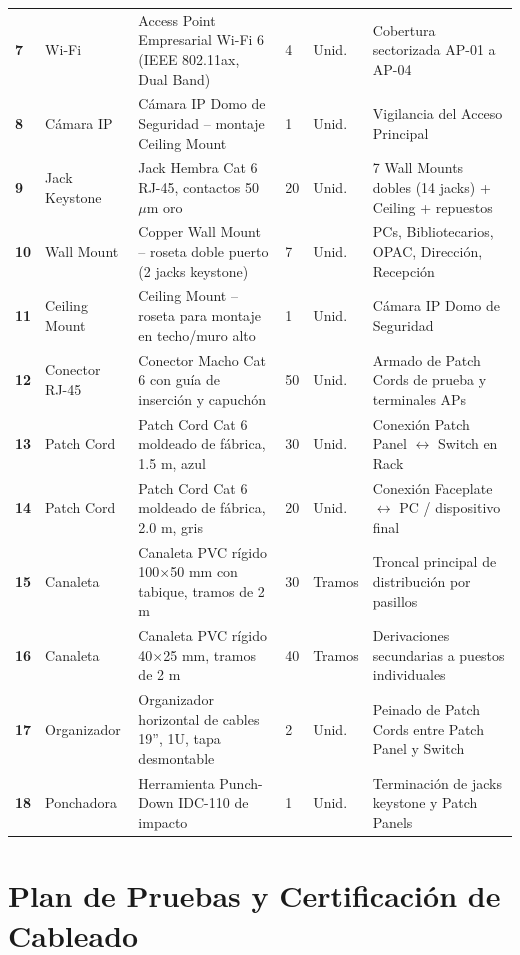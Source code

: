\documentclass[12pt,a4paper]{article}
\begin{document}
\begin{longtable}{>{\centering\bfseries\small}p{0.5cm}>{\small}p{1.9cm}>{\small}p{4.8cm}>{\centering\small}p{1.1cm}>{\centering\small}p{1cm}>{\small}p{3.6cm}}
  7  & Wi-Fi          & Access Point Empresarial Wi-Fi 6 (IEEE 802.11ax, Dual Band)       & 4  & Unid.  & Cobertura sectorizada AP-01 a AP-04 \\
  8  & Cámara IP      & Cámara IP Domo de Seguridad -- montaje Ceiling Mount              & 1  & Unid.  & Vigilancia del Acceso Principal \\
  9  & Jack Keystone  & Jack Hembra Cat 6 RJ-45, contactos 50 $\mu$m oro                  & 20 & Unid.  & 7 Wall Mounts dobles (14 jacks) + Ceiling + repuestos \\
  10 & Wall Mount     & Copper Wall Mount -- roseta doble puerto (2 jacks keystone)       & 7  & Unid.  & PCs, Bibliotecarios, OPAC, Dirección, Recepción \\
  11 & Ceiling Mount  & Ceiling Mount -- roseta para montaje en techo/muro alto           & 1  & Unid.  & Cámara IP Domo de Seguridad \\
  12 & Conector RJ-45 & Conector Macho Cat 6 con guía de inserción y capuchón             & 50 & Unid.  & Armado de Patch Cords de prueba y terminales APs \\
  13 & Patch Cord     & Patch Cord Cat 6 moldeado de fábrica, 1.5 m, azul                 & 30 & Unid.  & Conexión Patch Panel $\leftrightarrow$ Switch en Rack \\
  14 & Patch Cord     & Patch Cord Cat 6 moldeado de fábrica, 2.0 m, gris                 & 20 & Unid.  & Conexión Faceplate $\leftrightarrow$ PC / dispositivo final \\
  15 & Canaleta       & Canaleta PVC rígido 100$\times$50 mm con tabique, tramos de 2 m   & 30 & Tramos & Troncal principal de distribución por pasillos \\
  16 & Canaleta       & Canaleta PVC rígido 40$\times$25 mm, tramos de 2 m                & 40 & Tramos & Derivaciones secundarias a puestos individuales \\
  17 & Organizador    & Organizador horizontal de cables 19'', 1U, tapa desmontable       & 2  & Unid.  & Peinado de Patch Cords entre Patch Panel y Switch \\
  18 & Ponchadora     & Herramienta Punch-Down IDC-110 de impacto                         & 1  & Unid.  & Terminación de jacks keystone y Patch Panels \\
\end{longtable}

\section{Plan de Pruebas y Certificación de Cableado}
\end{document}
